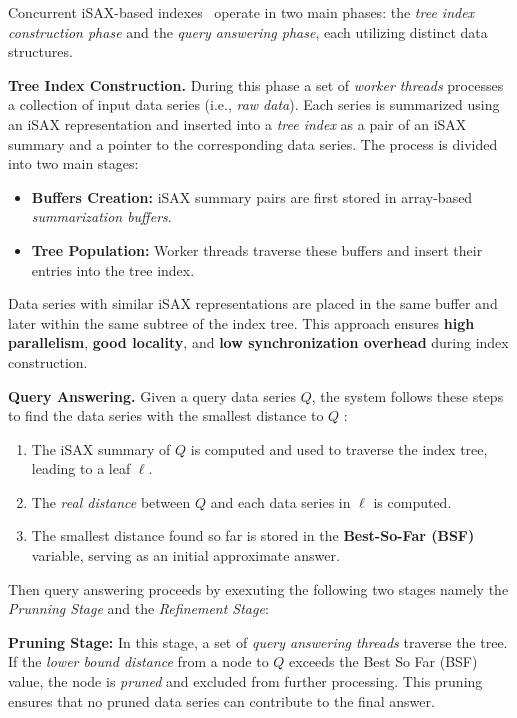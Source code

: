 Concurrent iSAX-based indexes~\cite{peng2018paris,parisplus,peng2020messi,  
PFP21-I,PFP21-II} operate in two main phases:  
the \textit{tree index construction phase} and the \textit{query answering phase},  
each utilizing distinct data structures. 

\noindent\textbf{Tree Index Construction.} During this phase a set of \textit{worker threads}  
processes a collection of input data series (i.e., \textit{raw data}).  
Each series is summarized using an iSAX representation and inserted into a 
\textit{tree index} as a pair of an iSAX summary and a pointer to the corresponding 
data series.  
% 
The process is divided into two main stages:
\begin{itemize}
    \item \textbf{Buffers Creation:} iSAX summary pairs are first stored in array-based  
    \textit{summarization buffers}.  
    \item \textbf{Tree Population:} Worker threads traverse these buffers and insert 
    their entries into the tree index.  
\end{itemize}  
Data series with similar iSAX representations are placed in the same buffer and later  
within the same subtree of the index tree.  
This approach ensures \textbf{high parallelism}, \textbf{good locality}, and  
\textbf{low synchronization overhead} during index construction.

\noindent\textbf{Query Answering.}  
Given a query data series \( Q \), the system follows these steps
to find the data series with the smallest distance to \( Q \) :  
\vspace{-10pt} %
\begin{enumerate}[noitemsep, topsep=3pt, partopsep=0pt, parsep=0pt]
    \item The iSAX summary of \( Q \) is computed and used to traverse the index tree,  
    leading to a leaf \( \ell \).  
    \item The \textit{real distance} between \( Q \) and each data series in \( \ell \) is computed.  
    \item The smallest distance found so far is stored in the \textbf{Best-So-Far (BSF)} variable,  
    serving as an initial approximate answer.  
\end{enumerate}  
% 
Then query answering proceeds by exexuting the following two stages
namely the \textit{Prunning Stage} and the \textit{Refinement Stage}:

\noindent\textbf{Pruning Stage:} In this stage, a set of \textit{query answering threads}
traverse the tree. If the \textit{lower bound distance} from a node to $Q$
exceeds the Best So Far (BSF) value, the node is \textit{pruned} and excluded from
further processing. This pruning ensures that no pruned data series can contribute
to the final answer.

